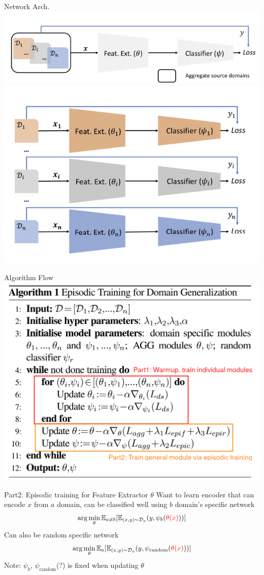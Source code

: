 \documentclass{beamer}
\begin{document}
\begin{frame}{Network Arch.}
  \includegraphics[width=.5\textwidth]{fig/epi-agg.png}
  \includegraphics[width=.5\textwidth]{fig/epi-ind.png}
\end{frame}

\begin{frame}{Algorithm Flow}
  \includegraphics[width=.7\textwidth]{fig/epi-alg-flow.png}
\end{frame}

\begin{frame}{Part2: Episodic training for Feature Extractor $\theta$}
    Want to learn encoder that can encode $x$ from $a$ domain, can be classified well using $b$ domain's specific network
    \begin{equation*}
      \arg \min_\theta \mathbb{E}_{ a \neq b} [\mathbb{E}_{(x,y) \sim \mathcal{D}_a}(y, \psi_b({\color{red}{\theta(x)}}))] 
    \end{equation*}
    \vspace{1em}
    Can also be random specific network
    \begin{equation*}
      \arg \min_\theta \mathbb{E}_{a} [\mathbb{E}_{(x,y) \sim \mathcal{D}_a}(y, \psi_{\text{random}}({\color{red}{\theta(x)}}))] 
    \end{equation*}
    \vspace{1em}
    Note: $\psi_b$, $\psi_{\text{random}}$(?) is fixed when updating $\theta$
\end{frame}
\end{document}
